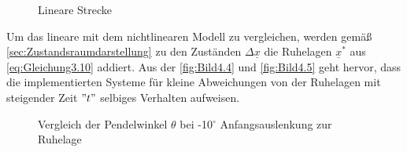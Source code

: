 \begin{figure}[H]
   \centering
   \caption[Lineare Strecke]{Lineare Strecke}
   \label{fig:Bild4.3}
\end{figure}

Um das lineare mit dem nichtlinearen Modell zu vergleichen, werden gemäß \autoref{sec:Zustandsraumdarstellung} zu den Zuständen $\Delta \underline{x}$ die Ruhelagen $\underline{x}^*$ aus \autoref{eq:Gleichung3.10} addiert. Aus der \autoref{fig:Bild4.4} und \autoref{fig:Bild4.5} geht hervor, dass die implementierten Systeme für kleine Abweichungen von der Ruhelagen mit steigender Zeit $"t"$ selbiges Verhalten aufweisen.

\begin{figure}[H]
   \centering
   \caption[Vergleich der Pendelwinkel $\theta$ - kleine Auslenkung]{Vergleich der Pendelwinkel $\theta$ bei -10${^\circ}$ Anfangsauslenkung zur Ruhelage}
   \label{fig:Bild4.4}
\end{figure}

